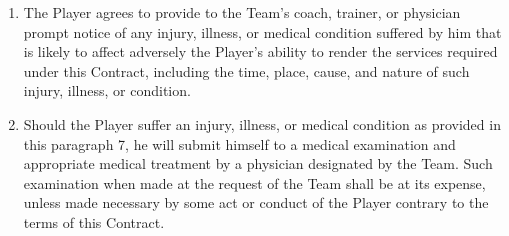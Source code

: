 \documentclass[
]{book}
\begin{document}
\begin{enumerate}
\item
  The Player agrees to provide to the Team's coach, trainer, or physician prompt notice of any injury, illness, or medical condition suffered by him that is likely to affect adversely the Player's ability to render the services required under this Contract, including the time, place, cause, and nature of such injury, illness, or condition.
\item
  Should the Player suffer an injury, illness, or medical condition as provided in this paragraph 7, he will submit himself to a medical examination and appropriate medical treatment by a physician designated by the Team. Such examination when made at the request of the Team shall be at its expense, unless made necessary by some act or conduct of the Player contrary to the terms of this Contract.
\end{enumerate}
\end{document}
